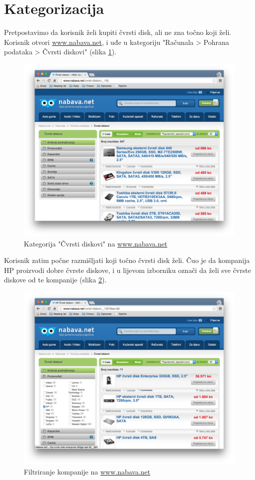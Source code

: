 \documentclass[a4paper,twoside,12pt]{memoir}
\begin{document}
\section{Kategorizacija}

Pretpostavimo da korisnik želi kupiti čvrsti disk, ali ne zna točno koji želi. Korisnik otvori \url{www.nabava.net}, i uđe u kategoriju "Računala > Pohrana podataka > Čvrsti diskovi" (slika \ref{nabava1}).

\begin{figure}[H]
  \centering
  \includegraphics[width=\textwidth]{nabava1}
  \caption{Kategorija "Čvrsti diskovi" na \url{www.nabava.net}}
  \label{nabava1}
\end{figure}

Korisnik zatim počne razmišljati koji točno čvrsti disk želi. Čuo je da kompanija HP proizvodi dobre čvrste diskove, i u lijevom izborniku označi da želi sve čvrste diskove od te kompanije (slika \ref{nabava2}).

\begin{figure}[H]
  \centering
  \includegraphics[width=\textwidth]{nabava2}
  \caption{Filtriranje kompanije na \url{www.nabava.net}}
  \label{nabava2}
\end{figure}
\end{document}
